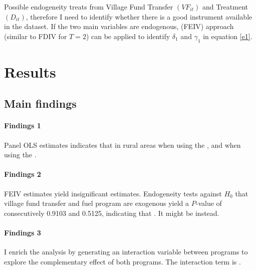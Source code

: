 \documentclass[letterpaper,12pt,leqno]{article}
\begin{document}
Possible endogeneity treats from Village Fund Transfer $(VF_{it})$ and Treatment $(D_{it})$, therefore I need to identify whether there is a good instrument available in the dataset. If the two main variables are endogenous,  (FEIV) approach (similar to FDIV for $T=2$) can be applied to identify $\delta_1$ and $\gamma_1$ in equation \eqref{e1}.

\section{Results}\label{s:result}
\subsection{Main findings}

\paragraph{Findings 1}
        Panel OLS estimates indicates that  in rural areas when using the , and  when using the . 
        
\paragraph{Findings 2}
        FEIV estimates yield insignificant estimates. Endogeneity tests against $H_0$ that village fund transfer and fuel program are exogenous yield a $P$-value of consecutively 0.9103 and 0.5125, indicating that . It might be  instead.

\paragraph{Findings 3}
        I enrich the analysis by generating an interaction variable between programs to explore the complementary effect of both programs. The interaction term is .
\end{document}
